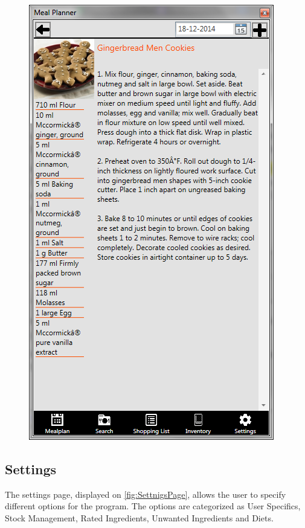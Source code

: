 \begin{figure}[H]
\begin{minipage}{.33\textwidth}
  \includegraphics[width=.9\linewidth]{Grafik/RecipePage}
  \label{fig:RecipePage}
\end{minipage}%
\end{figure}

\subsection{Settings} \label{ss:settings}
The settings page, displayed on \cref{fig:SettnigsPage}, allows the user to specify different options for the program. The options are categorized as User Specifics, Stock Management, Rated Ingredients, Unwanted Ingredients and Diets.

